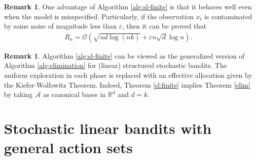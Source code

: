 \documentclass[10pt, openright]{book}
\numberwithin{equation}{section}
\theoremstyle{plain}
\theoremstyle{definition}
\newtheorem{Rem}[Th]{Remark}
\def\R{{\mathbb R}}
\def\R{{\mathbb R}}
\def\e{{\varepsilon}}
\begin{document}
\begin{Rem}
One advantage of Algorithm \ref{alg:sl-finite} is that it behaves well even when the model is misspecified. Particularly, if the observation $x_t$ is contaminated by some noise of magnitude less than $\e$, then it can be proved that 
\begin{align*}
R_n=\mathcal O\left(\sqrt{nd\log (nk)}+\e n\sqrt{d}\log n\right). 
\end{align*}
\end{Rem}

\begin{Rem}
Algorithm \ref{alg:sl-finite} can be viewed as the generalized version of Algorithm \ref{alg:elimination} for (linear) structured stochastic bandits. The uniform exploration in each phase is replaced with an effective allocation given by the Kiefer-Wolfowitz Theorem. Indeed, Theorem \ref{sl:finite} implies Theorem \ref{elim} by taking $\mathcal A$ as canonical bases in $\R^d$ and $d=k$.  
\end{Rem}

\section{Stochastic linear bandits with general action sets}
\end{document}
